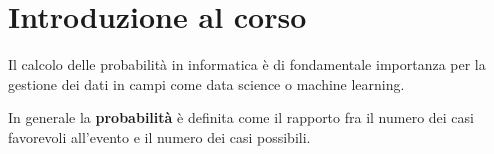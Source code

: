 \chapter*{Introduzione al corso}

Il calcolo delle probabilità in informatica è di fondamentale importanza per la gestione dei dati in campi come data science o machine learning.
\begin{redbar}
    In generale la \textbf{probabilità} è definita come il rapporto fra il numero dei casi favorevoli all'evento e il numero dei casi possibili.  
\end{redbar}

